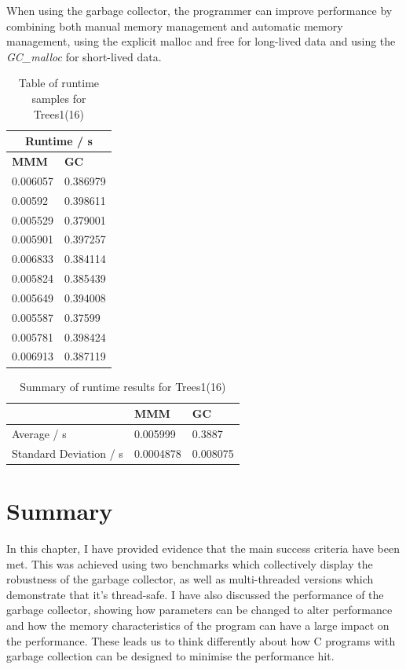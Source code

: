 \documentclass[../diss.tex]{subfiles}
\begin{document}
When using the garbage collector, the programmer can improve performance by combining both manual memory management and automatic memory management, using the explicit malloc and free for long-lived data and using the \emph{GC\_malloc} for short-lived data.

\begin{table}
    \centering
    \begin{tabular}{| l | l |}
        \hline
         \multicolumn{2}{|c|}{\bf{Runtime / s}} \\ \hline
         \bf{MMM} & \bf{GC} \\ \hline
         0.006057 & 0.386979 \\ \hline
         0.00592 & 0.398611 \\ \hline
         0.005529 & 0.379001 \\ \hline
         0.005901 &	0.397257 \\ \hline
         0.006833 &	0.384114 \\ \hline
         0.005824 &	0.385439 \\ \hline
         0.005649 &	0.394008 \\ \hline
         0.005587 &	0.37599 \\ \hline
         0.005781 &	0.398424 \\ \hline
         0.006913 & 0.387119 \\ \hline
    \end{tabular}
    \caption{Table of runtime samples for Trees1(16)}
    \label{tab:treesamples}
\end{table}

\begin{table}
    \centering
    \begin{tabular}{| l | l | l |}
        \hline
         & \bf{MMM} & \bf{GC} \\ \hline
         Average / s & 0.005999 & 0.3887 \\ \hline
         Standard Deviation / s & 0.0004878 & 0.008075 \\ \hline
        
    \end{tabular}
    \caption{Summary of runtime results for Trees1(16)}
    \label{tab:treesummary}
\end{table}

\section{Summary}

In this chapter, I have provided evidence that the main success criteria have been met. This was achieved using two benchmarks which collectively display the robustness of the garbage collector, as well as multi-threaded versions which demonstrate that it's thread-safe. I have also discussed the performance of the garbage collector, showing how parameters can be changed to alter performance and how the memory characteristics of the program can have a large impact on the performance. These leads us to think differently about how C programs with garbage collection can be designed to minimise the performance hit.
\end{document}
